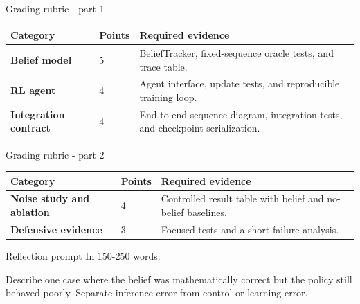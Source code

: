 \documentclass[aspectratio=169,11pt]{beamer}
\begin{document}
\begin{frame}{Grading rubric - part 1}
\scriptsize
\begin{tabularx}{\textwidth}{>{\bfseries}p{} p{} X}
\toprule
Category & Points & Required evidence \\
\midrule
Belief model & 5 & BeliefTracker, fixed-sequence oracle tests, and trace table. \\
RL agent & 4 & Agent interface, update tests, and reproducible training loop. \\
Integration contract & 4 & End-to-end sequence diagram, integration tests, and checkpoint serialization. \\
\bottomrule
\end{tabularx}
\end{frame}

\begin{frame}{Grading rubric - part 2}
\scriptsize
\begin{tabularx}{\textwidth}{>{\bfseries}p{} p{} X}
\toprule
Category & Points & Required evidence \\
\midrule
Noise study and ablation & 4 & Controlled result table with belief and no-belief baselines. \\
Defensive evidence & 3 & Focused tests and a short failure analysis. \\
\bottomrule
\end{tabularx}
\end{frame}

\begin{frame}{Reflection prompt}
In 150-250 words:

Describe one case where the belief was mathematically correct but the policy still behaved poorly. Separate inference error from control or learning error.
\end{frame}
\end{document}

